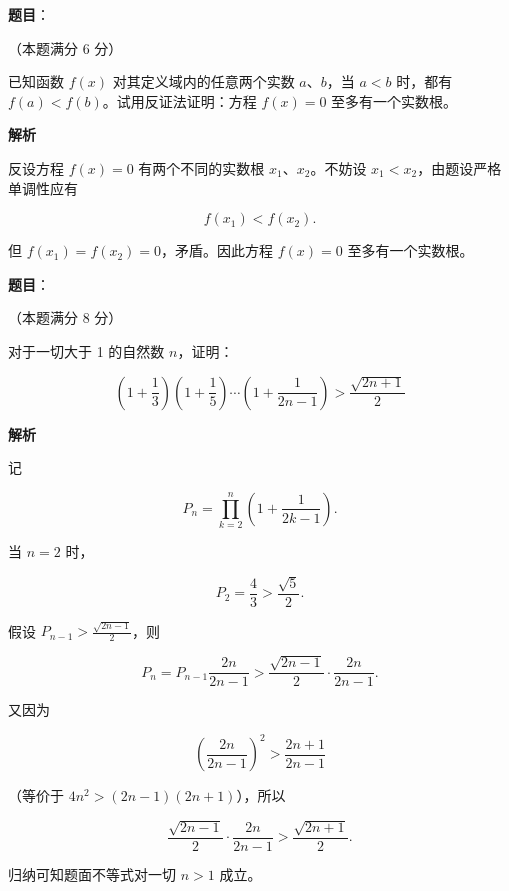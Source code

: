 \begin{answer}

\textbf{题目}：

（本题满分 6 分）

已知函数 $f(x)$ 对其定义域内的任意两个实数 $a\text{、}b$，当 $a<b$ 时，都有 $f(a)<f(b)$。试用反证法证明：方程 $f(x)=0$ 至多有一个实数根。

\textbf{解析}

反设方程 $f(x)=0$ 有两个不同的实数根 $x_1\text{、}x_2$。不妨设 $x_1<x_2$，由题设严格单调性应有

\nopagebreak[4]
\[
f(x_1)<f(x_2).
\]

但 $f(x_1)=f(x_2)=0$，矛盾。因此方程 $f(x)=0$ 至多有一个实数根。


\end{answer}
\begin{answer}

\textbf{题目}：

（本题满分 8 分）

对于一切大于 1 的自然数 $n$，证明：

\nopagebreak[4]
\[
\left(1+\frac13\right)\left(1+\frac15\right)\cdots\left(1+\frac1{2n-1}\right)>\frac{\sqrt{2n+1}}2
\]

\textbf{解析}

记

\nopagebreak[4]
\[
P_n=\prod_{k=2}^{n}\left(1+\frac1{2k-1}\right).
\]

当 $n=2$ 时，

\nopagebreak[4]
\[
P_2=\frac43>\frac{\sqrt5}{2}.
\]

假设 $P_{n-1}>\frac{\sqrt{2n-1}}2$，则

\nopagebreak[4]
\[
P_n=P_{n-1}\frac{2n}{2n-1}
>\frac{\sqrt{2n-1}}2\cdot\frac{2n}{2n-1}.
\]

又因为

\nopagebreak[4]
\[
\left(\frac{2n}{2n-1}\right)^2
>\frac{2n+1}{2n-1}
\]

（等价于 $4n^2>(2n-1)(2n+1)$），所以

\nopagebreak[4]
\[
\frac{\sqrt{2n-1}}2\cdot\frac{2n}{2n-1}
>\frac{\sqrt{2n+1}}2.
\]

归纳可知题面不等式对一切 $n>1$ 成立。


\end{answer}
